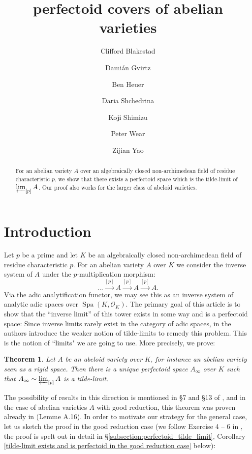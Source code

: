 \documentclass[10pt,oneside]{amsart}
\title[perfectoid covers of abelian varieties]{perfectoid  covers of abelian varieties}
\author{
	Clifford Blakestad \and
	Dami\'an Gvirtz \and
	Ben Heuer \and 
	Daria Shchedrina \and
	Koji Shimizu \and 
	Peter Wear \and
	Zijian Yao}
\newtheorem{mainthm}{Theorem}
\theoremstyle{definition}
\begin{document}
	
	\maketitle
	
	\begin{abstract}
For an abelian variety $A$ over an algebraically closed non-archimedean field of residue characteristic $p$, we show that there exists a perfectoid space which is the tilde-limit of $\varprojlim_{[p]}A$. Our proof also works for the larger class of abeloid varieties.
	\end{abstract}
	

	
	\section{Introduction} 

Let $p$ be a prime and let $K$ be an algebraically closed non-archimedean field of residue characteristic $p$.
For an abelian variety $A$ over $K$ we consider the inverse system of $A$ under the $p$-multiplication morphism:
\[\dots\xrightarrow{[p]}A\xrightarrow{[p]}A\xrightarrow{[p]}A.\]
Via the adic analytification functor, we may see this as an inverse system of analytic adic spaces over $\operatorname{Spa}(K,\mathcal O_K)$.
The primary goal of this article is to show that the ``inverse limit'' of this tower exists in some way and is a perfectoid space: Since inverse limits rarely exist in the category of adic spaces, in \cite{SW} the authors introduce the weaker notion of tilde-limits to remedy this problem. This is the notion of ``limits" we are going to use. More precisely, we prove:

 


\begin{mainthm} \label{thm:main_thm_intro}
	Let $A$ be an abeloid variety over $K$, for instance an abelian variety seen as a rigid space. Then there is a unique perfectoid space $A_\infty$ over $K$ such that
	$A_\infty \sim \varprojlim_{[p]} A$ is a tilde-limit.
\end{mainthm}

The possibility of results in this direction is mentioned in \S 7 and \S 13 of \cite{scholzeICMproceedings}, and in the case of abelian varieties $A$ with good reduction, this theorem was proven already in \cite{Pilloni-Stroh} (Lemme A.16).  In order to motivate our strategy for the general case, let us sketch the proof in the good reduction case (we follow Exercise 4 -- 6 in \cite{Bhatt}, the proof is spelt out in detail in \S \ref{subsection:perfectoid_tilde_limit}, Corollary \ref{tilde-limit exists and is perfectoid in the good reduction case} below):
\end{document}
